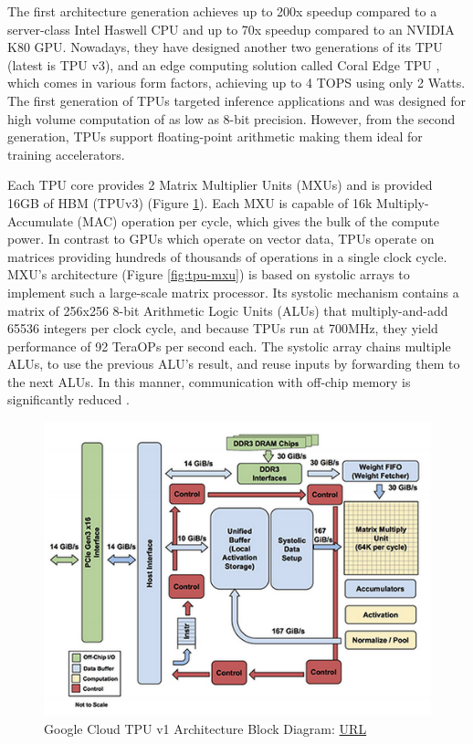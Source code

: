 The first architecture generation achieves up to 200x speedup compared to a server-class Intel Haswell CPU and up to 70x speedup compared to an NVIDIA K80 GPU. Nowadays, they have designed another two generations of its TPU (latest is TPU v3), and an edge computing solution called Coral Edge TPU \cite{Coral-Edge-TPU}, which comes in various form factors, achieving up to 4 TOPS using only 2 Watts. The first generation of TPUs targeted inference applications and was designed for high volume computation of as low as 8-bit precision. However, from the second generation, TPUs support floating-point arithmetic making them ideal for training accelerators.

Each TPU core provides 2 Matrix Multiplier Units (MXUs) and is provided 16GB of HBM (TPUv3) (Figure \ref{fig:tpu-v1-block-diagram}). Each MXU is capable of 16k Multiply-Accumulate (MAC) operation per cycle, which gives the bulk of the compute power. In contrast to GPUs which operate on vector data, TPUs operate on matrices providing hundreds of thousands of operations in a single clock cycle. MXU's architecture (Figure \ref{fig:tpu-mxu}) is based on systolic arrays to implement such a large-scale matrix processor. Its systolic mechanism contains a matrix of 256x256 8-bit Arithmetic Logic Units (ALUs) that multiply-and-add 65536 integers per clock cycle, and because TPUs run at 700MHz, they yield performance of 92 TeraOPs per second each. The systolic array chains multiple ALUs, to use the previous ALU's result, and reuse inputs by forwarding them to the next ALUs. In this manner, communication with off-chip memory is significantly reduced \cite{An-in-depth-look-at-Google-first-TPU}.

\begin{figure} [H]
	\centering
	\includegraphics[width=\textwidth]{Images/Hardware/tpu-v1-block-diagram.png}
	\decoRule
	\caption[Google Cloud TPU v1 Architecture Block Diagram]{Google Cloud TPU v1 Architecture Block Diagram: \href{https://cloud.google.com/blog/products/gcp/an-in-depth-look-at-googles-first-tensor-processing-unit-tpu}{URL}}
	\label{fig:tpu-v1-block-diagram}
\end{figure}

